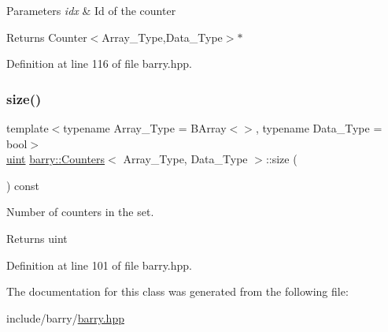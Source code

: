 \begin{DoxyParams}{Parameters}
{\em idx} & Id of the counter \\
\hline
\end{DoxyParams}
\begin{DoxyReturn}{Returns}
Counter$<$\+Array\+\_\+\+Type,\+Data\+\_\+\+Type$>$$\ast$ 
\end{DoxyReturn}


Definition at line 116 of file barry.\+hpp.

\mbox{\label{classbarry_1_1_counters_aa70f3d91d0f69ff8f4887930efaa0411}} 
\subsubsection{\texorpdfstring{size()}{size()}}
{\footnotesize\ttfamily template$<$typename Array\+\_\+\+Type = B\+Array$<$$>$, typename Data\+\_\+\+Type = bool$>$ \\
\hyperlink{namespacebarry_a11dfc53ddb4672278319aa04f1e09a6c}{uint} \hyperlink{classbarry_1_1_counters}{barry\+::\+Counters}$<$ Array\+\_\+\+Type, Data\+\_\+\+Type $>$\+::size (\begin{DoxyParamCaption}{ }\end{DoxyParamCaption}) const\hspace{0.3cm}{\ttfamily [inline]}}



Number of counters in the set. 

\begin{DoxyReturn}{Returns}
uint 
\end{DoxyReturn}


Definition at line 101 of file barry.\+hpp.



The documentation for this class was generated from the following file\+:\begin{DoxyCompactItemize}
\item 
include/barry/\hyperlink{barry_8hpp}{barry.\+hpp}\end{DoxyCompactItemize}
